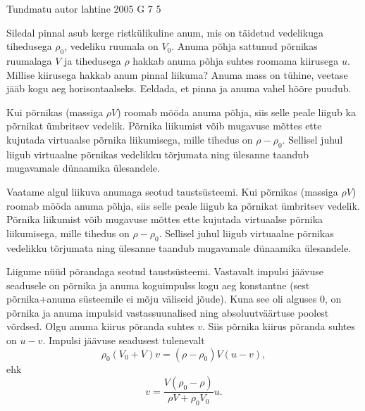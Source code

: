 {Tundmatu autor} %
{lahtine} %
{2005} %
{G 7} %
{5} %
{
\ifStatement
Siledal pinnal asub kerge ristkülikuline anum, mis on täidetud vedelikuga tihedusega $\rho_0$, vedeliku ruumala on $V_0$. Anuma põhja sattunud põrnikas ruumalaga $V$ ja tihedusega $\rho$ hakkab anuma põhja suhtes roomama kiirusega $u$. Millise kiirusega hakkab anum pinnal liikuma? Anuma mass on tühine, veetase jääb kogu aeg horisontaalseks. Eeldada, et pinna ja anuma vahel hõõre puudub.
\fi


\ifHint
Kui põrnikas (massiga $\rho V$) roomab mööda anuma põhja, siis selle peale liigub ka põrnikat ümbritsev vedelik. Põrnika liikumist võib mugavuse mõttes ette kujutada virtuaalse põrnika liikumisega, mille tihedus on $\rho - \rho_0$. Sellisel juhul liigub virtuaalne põrnikas vedelikku tõrjumata ning ülesanne taandub mugavamale dünaamika ülesandele.
\fi


\ifSolution
Vaatame algul liikuva anumaga seotud taustsüsteemi. Kui põrnikas (massiga $\rho V$) roomab mööda anuma põhja, siis selle peale liigub ka põrnikat ümbritsev vedelik. Põrnika liikumist võib mugavuse mõttes ette kujutada virtuaalse põrnika liikumisega, mille tihedus on $\rho - \rho_0$. Sellisel juhul liigub virtuaalne põrnikas vedelikku tõrjumata ning ülesanne taandub mugavamale dünaamika ülesandele.

Liigume nüüd põrandaga seotud taustsüsteemi. Vastavalt impulsi jäävuse seadusele on põrnika ja anuma koguimpulss kogu aeg konstantne (sest põrnika+anuma süsteemile ei mõju väliseid jõude). Kuna see oli alguses 0, on põrnika ja anuma impulsid vastassuunalised ning absoluutväärtuse poolest võrdsed. Olgu anuma kiirus põranda suhtes $v$. Siis põrnika kiirus põranda suhtes on $u - v$. Impulsi jäävuse seadusest tulenevalt
\[
\rho_0 (V_0 + V ) v = (\rho - \rho_0) V (u - v),
\]
ehk
\[
v=\frac{V\left(\rho_{0}-\rho\right)}{\rho V+\rho_{0} V_{0}}u.
\]
\fi
}